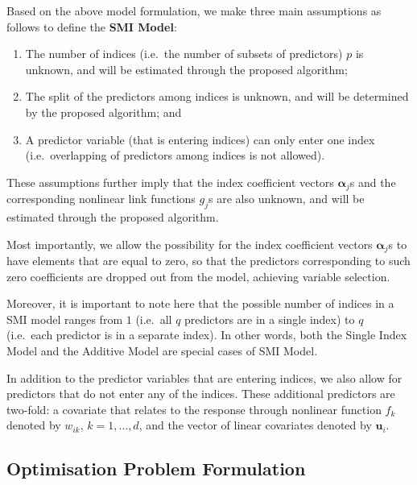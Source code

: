 \documentclass[11pt,a4paper,]{article}
\begin{document}
Based on the above model formulation, we make three main assumptions as
follows to define the \textbf{SMI Model}:

\begin{enumerate}
\def\labelenumi{\arabic{enumi}.}
\item
  The number of indices (i.e.~the number of subsets of predictors) \(p\)
  is unknown, and will be estimated through the proposed algorithm;
\item
  The split of the predictors among indices is unknown, and will be
  determined by the proposed algorithm; and
\item
  A predictor variable (that is entering indices) can only enter one
  index (i.e.~overlapping of predictors among indices is not allowed).
\end{enumerate}

These assumptions further imply that the index coefficient vectors
\(\bm{\alpha}_{j}\)s and the corresponding nonlinear link functions
\(g_{j}\)s are also unknown, and will be estimated through the proposed
algorithm.

Most importantly, we allow the possibility for the index coefficient
vectors \(\bm{\alpha}_{j}\)s to have elements that are equal to zero, so
that the predictors corresponding to such zero coefficients are dropped
out from the model, achieving variable selection.

Moreover, it is important to note here that the possible number of
indices in a SMI model ranges from \(1\) (i.e.~all \(q\) predictors are
in a single index) to \(q\) (i.e.~each predictor is in a separate
index). In other words, both the Single Index Model and the Additive
Model are special cases of SMI Model.

In addition to the predictor variables that are entering indices, we
also allow for predictors that do not enter any of the indices. These
additional predictors are two-fold: a covariate that relates to the
response through nonlinear function \(f_{k}\) denoted by \(w_{ik}\),
\(k = 1, \dots, d\), and the vector of linear covariates denoted by
\(\bm{u}_{i}\).

\hypertarget{optimisation-problem-formulation}{%
\subsection{Optimisation Problem
Formulation}\label{optimisation-problem-formulation}}
\end{document}
